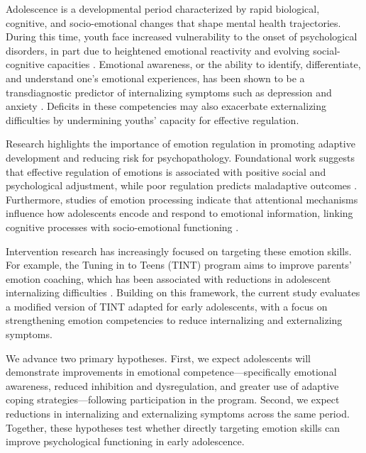 
Adolescence is a developmental period characterized by rapid biological, cognitive, and socio-emotional changes that shape mental health trajectories. During this time, youth face increased vulnerability to the onset of psychological disorders, in part due to heightened emotional reactivity and evolving social-cognitive capacities \citep{jaworska2015adolescent}. Emotional awareness, or the ability to identify, differentiate, and understand one’s emotional experiences, has been shown to be a transdiagnostic predictor of internalizing symptoms such as depression and anxiety \citep{kranzler2016emotional}. Deficits in these competencies may also exacerbate externalizing difficulties by undermining youths’ capacity for effective regulation.

Research highlights the importance of emotion regulation in promoting adaptive development and reducing risk for psychopathology. Foundational work suggests that effective regulation of emotions is associated with positive social and psychological adjustment, while poor regulation predicts maladaptive outcomes \citep{eisenberg2001relations}. Furthermore, studies of emotion processing indicate that attentional mechanisms influence how adolescents encode and respond to emotional information, linking cognitive processes with socio-emotional functioning \citep{brenner2014role}.

Intervention research has increasingly focused on targeting these emotion skills. For example, the Tuning in to Teens (TINT) program aims to improve parents’ emotion coaching, which has been associated with reductions in adolescent internalizing difficulties \citep{kehoe2014tuning}. Building on this framework, the current study evaluates a modified version of TINT adapted for early adolescents, with a focus on strengthening emotion competencies to reduce internalizing and externalizing symptoms.

We advance two primary hypotheses. First, we expect adolescents will demonstrate improvements in emotional competence—specifically emotional awareness, reduced inhibition and dysregulation, and greater use of adaptive coping strategies—following participation in the program. Second, we expect reductions in internalizing and externalizing symptoms across the same period. Together, these hypotheses test whether directly targeting emotion skills can improve psychological functioning in early adolescence.

